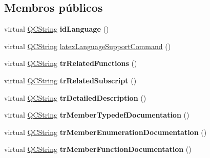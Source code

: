 \subsection*{Membros públicos}
\begin{DoxyCompactItemize}
\item 
\hypertarget{class_translator_swedish_a903bf0b486fd16dfbc84606e8474ff84}{virtual \hyperlink{class_q_c_string}{Q\-C\-String} {\bfseries id\-Language} ()}\label{class_translator_swedish_a903bf0b486fd16dfbc84606e8474ff84}

\item 
virtual \hyperlink{class_q_c_string}{Q\-C\-String} \hyperlink{class_translator_swedish_a38858830a8a30ed8dd67927882d27ff3}{latex\-Language\-Support\-Command} ()
\item 
\hypertarget{class_translator_swedish_a9cdd41a0b3211b9f7f156ddf0176e848}{virtual \hyperlink{class_q_c_string}{Q\-C\-String} {\bfseries tr\-Related\-Functions} ()}\label{class_translator_swedish_a9cdd41a0b3211b9f7f156ddf0176e848}

\item 
\hypertarget{class_translator_swedish_a122dc85b3ca735f9344e86cdea420442}{virtual \hyperlink{class_q_c_string}{Q\-C\-String} {\bfseries tr\-Related\-Subscript} ()}\label{class_translator_swedish_a122dc85b3ca735f9344e86cdea420442}

\item 
\hypertarget{class_translator_swedish_a3b56ac2f0285e4ca64e85fe42b3b6510}{virtual \hyperlink{class_q_c_string}{Q\-C\-String} {\bfseries tr\-Detailed\-Description} ()}\label{class_translator_swedish_a3b56ac2f0285e4ca64e85fe42b3b6510}

\item 
\hypertarget{class_translator_swedish_af1e0f39dbc5f29620b3654646530b7e1}{virtual \hyperlink{class_q_c_string}{Q\-C\-String} {\bfseries tr\-Member\-Typedef\-Documentation} ()}\label{class_translator_swedish_af1e0f39dbc5f29620b3654646530b7e1}

\item 
\hypertarget{class_translator_swedish_a9ac93f67124761e42466a1d44bff46a7}{virtual \hyperlink{class_q_c_string}{Q\-C\-String} {\bfseries tr\-Member\-Enumeration\-Documentation} ()}\label{class_translator_swedish_a9ac93f67124761e42466a1d44bff46a7}

\item 
\hypertarget{class_translator_swedish_aa033beeb0850c3146fcea2aa5252b4ba}{virtual \hyperlink{class_q_c_string}{Q\-C\-String} {\bfseries tr\-Member\-Function\-Documentation} ()}\label{class_translator_swedish_aa033beeb0850c3146fcea2aa5252b4ba}


\end{DoxyCompactItemize}
